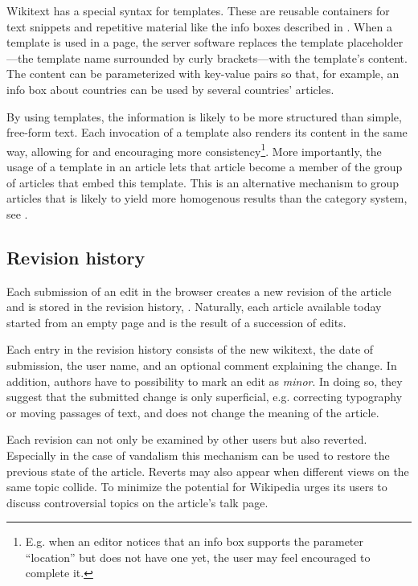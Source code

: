 Wikitext has a special syntax for templates. 
These are reusable containers for text snippets and repetitive material like the info boxes described in .
When a template is used in a page, the server software replaces the template placeholder---the template name surrounded by curly brackets---with the template's content.
The content can be parameterized with key-value pairs so that, for example, an info box about countries can be used by several countries' articles.

By using templates, the information is likely to be more structured than simple, free-form text.
Each invocation of a template also renders its content in the same way, allowing for and encouraging more consistency\footnote{E.g. when an editor notices that an info box supports the parameter ``location'' but does not have one yet, the user may feel encouraged to complete it.}.
More importantly, the usage of a template in an article lets that article become a member of the group of articles that embed this template.
This is an alternative mechanism to group articles that is likely to yield more homogenous results than the category system, see .

\subsection{Revision history}\label{sub:revisionhistory}

Each submission of an edit in the browser creates a new revision of the article and is stored in the revision history, .
Naturally, each article available today started from an empty page and is the result of a succession of edits.


Each entry in the revision history consists of the new wikitext, the date of submission, the user name, and an optional comment explaining the change.
In addition, authors have to possibility to mark an edit as \emph{minor}.
In doing so, they suggest that the submitted change is only superficial, e.g. correcting typography or moving passages of text, and does not change the meaning of the article.\cite{wpminor}

Each revision can not only be examined by other users but also reverted. 
Especially in the case of vandalism this mechanism can be used to restore the previous state of the article.
Reverts may also appear when different views on the same topic collide.
To minimize the potential for \cite{suh2007us} Wikipedia urges its users to discuss controversial topics on the article's talk page.


